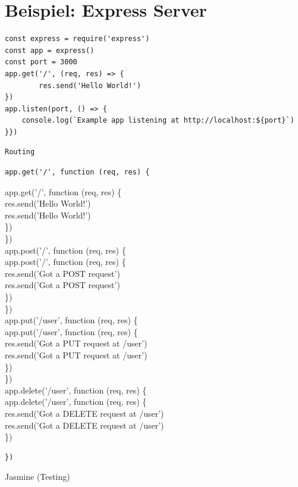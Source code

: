 \documentclass[10pt]{article}
\begin{document}
\section*{Beispiel: Express Server}
\begin{verbatim}
const express = require('express')
const app = express()
const port = 3000
app.get('/', (req, res) => {
        res.send('Hello World!')
})
app.listen(port, () => {
    console.log(`Example app listening at http://localhost:${port}`)
}})
\end{verbatim}

\begin{verbatim}
Routing
\end{verbatim}

\begin{verbatim}
app.get('/', function (req, res) {
\end{verbatim}

app.get('/', function (req, res) \{\\
res.send('Hello World!')\\
res.send('Hello World!')\\
\})\\
\})\\
app.post('/', function (req, res) \{\\
app.post('/', function (req, res) \{\\
res.send('Got a POST request')\\
res.send('Got a POST request')\\
\})\\
\})\\
app.put('/user', function (req, res) \{\\
app.put('/user', function (req, res) \{\\
res.send('Got a PUT request at /user')\\
res.send('Got a PUT request at /user')\\
\})\\
\})\\
app.delete('/user', function (req, res) \{\\
app.delete('/user', function (req, res) \{\\
res.send('Got a DELETE request at /user')\\
res.send('Got a DELETE request at /user')\\
\})

\begin{verbatim}
})
\end{verbatim}

Jasmine (Testing)
\end{document}
